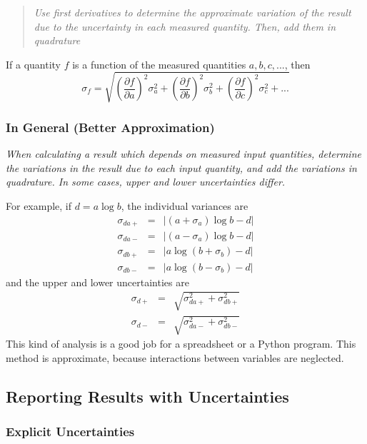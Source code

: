 \documentclass[12pt]{article}
\begin{document}
\begin{quote}
\textit{Use first derivatives to determine the approximate
  variation of the result due to the uncertainty in each measured
  quantity. Then, add them in quadrature}
\end{quote}

If a quantity $f$ is a function of the measured quantities $a, b, c,
...$, then 
\begin{equation}
\sigma_f = \sqrt{
\left(\frac{\partial f}{\partial a} \right)^2 \sigma_a^2
+\left(\frac{\partial f}{\partial b} \right)^2 \sigma_b^2
+\left(\frac{\partial f}{\partial c} \right)^2 \sigma_c^2 
+ ...
}
\end{equation}

\subsubsection*{In General (Better Approximation)}

\textit{When calculating a result which depends on measured
input quantities, determine the variations in the result due to each
input quantity, and add the variations in quadrature. In some cases,
upper and lower uncertainties differ.}

For example, if $d = a \log b$, the individual variances are 
\begin{eqnarray}
\nonumber
\sigma_{da+} &=& |(a+\sigma_a) \log b - d|\\
\nonumber
\sigma_{da-} &=& |(a-\sigma_a) \log b - d|\\
\nonumber
\sigma_{db+} &=& |a \log (b+\sigma_b) - d|\\
\sigma_{db-} &=& |a \log (b-\sigma_b) - d|
\end{eqnarray}
and the upper and lower uncertainties are
\begin{eqnarray}
\nonumber
\sigma_{d+} &=& \sqrt{\sigma_{da+}^2 + \sigma_{db+}^2}\\
\sigma_{d-} &=& \sqrt{\sigma_{da-}^2 + \sigma_{db-}^2}
\end{eqnarray}
This kind of analysis is a good job for a spreadsheet or a Python 
program. This method is approximate, because interactions between 
variables are neglected.

\subsection*{Reporting Results with Uncertainties}

\subsubsection*{Explicit Uncertainties}
\end{document}
